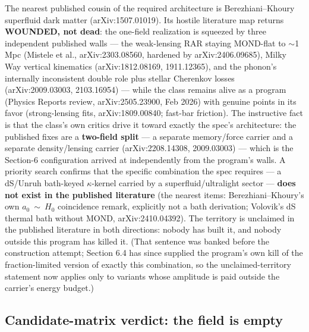 \documentclass[11pt,a4paper]{article}
\begin{document}
The nearest published cousin of the required architecture is Berezhiani--Khoury superfluid dark matter (arXiv:1507.01019). Its hostile literature map returns \textbf{WOUNDED, not dead}: the one-field realization is squeezed by three independent published walls --- the weak-lensing RAR staying MOND-flat to $\sim$1 Mpc (Mistele et al., arXiv:2303.08560, hardened by arXiv:2406.09685), Milky Way vertical kinematics (arXiv:1812.08169, 1911.12365), and the phonon's internally inconsistent double role plus stellar Cherenkov losses (arXiv:2009.03003, 2103.16954) --- while the class remains alive as a program (Physics Reports review, arXiv:2505.23900, Feb 2026) with genuine points in its favor (strong-lensing fits, arXiv:1809.00840; fast-bar friction). The instructive fact is that the class's own critics drive it toward exactly the spec's architecture: the published fixes are a \textbf{two-field split} --- a separate memory/force carrier and a separate density/lensing carrier (arXiv:2208.14308, 2009.03003) --- which is the Section-6 configuration arrived at independently from the program's walls. A priority search confirms that the specific combination the spec requires --- a dS/Unruh bath-keyed $\kappa$-kernel carried by a superfluid/ultralight sector --- \textbf{does not exist in the published literature} (the nearest items: Berezhiani--Khoury's own $a_{0}\ \sim\ H_{0}$ coincidence remark, explicitly not a bath derivation; Volovik's dS thermal bath without MOND, arXiv:2410.04392). The territory is unclaimed in the published literature in both directions: nobody has built it, and nobody outside this program has killed it. (That sentence was banked before the construction attempt; Section 6.4 has since supplied the program's own kill of the fraction-limited version of exactly this combination, so the unclaimed-territory statement now applies only to variants whose amplitude is paid outside the carrier's energy budget.)

\subsection{Candidate-matrix verdict: the field is empty}
\end{document}

